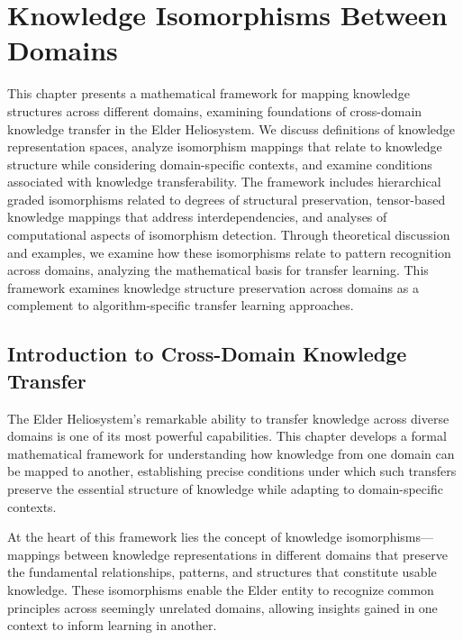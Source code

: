 \chapter{Knowledge Isomorphisms Between Domains}

\begin{tcolorbox}[colback=DarkSkyBlue!5!white,colframe=DarkSkyBlue!75!black,title=Chapter Summary]
This chapter presents a mathematical framework for mapping knowledge structures across different domains, examining foundations of cross-domain knowledge transfer in the Elder Heliosystem. We discuss definitions of knowledge representation spaces, analyze isomorphism mappings that relate to knowledge structure while considering domain-specific contexts, and examine conditions associated with knowledge transferability. The framework includes hierarchical graded isomorphisms related to degrees of structural preservation, tensor-based knowledge mappings that address interdependencies, and analyses of computational aspects of isomorphism detection. Through theoretical discussion and examples, we examine how these isomorphisms relate to pattern recognition across domains, analyzing the mathematical basis for transfer learning. This framework examines knowledge structure preservation across domains as a complement to algorithm-specific transfer learning approaches.
\end{tcolorbox}

\section{Introduction to Cross-Domain Knowledge Transfer}

The Elder Heliosystem's remarkable ability to transfer knowledge across diverse domains is one of its most powerful capabilities. This chapter develops a formal mathematical framework for understanding how knowledge from one domain can be mapped to another, establishing precise conditions under which such transfers preserve the essential structure of knowledge while adapting to domain-specific contexts.

At the heart of this framework lies the concept of knowledge isomorphisms—mappings between knowledge representations in different domains that preserve the fundamental relationships, patterns, and structures that constitute usable knowledge. These isomorphisms enable the Elder entity to recognize common principles across seemingly unrelated domains, allowing insights gained in one context to inform learning in another.

